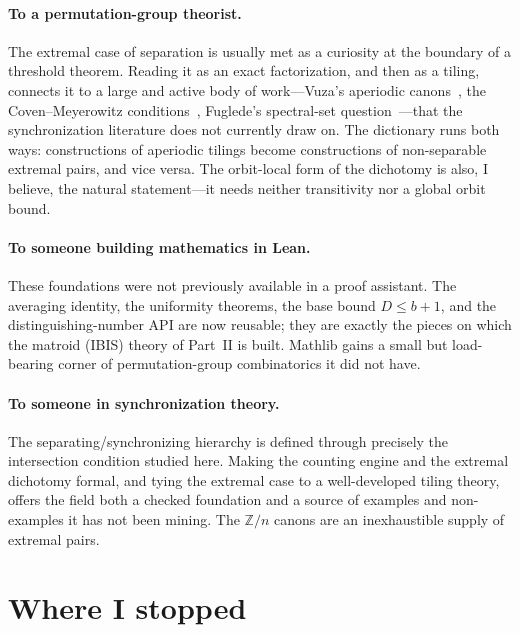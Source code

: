 \documentclass[11pt]{article}
\newcommand{\Z}{\mathbb{Z}}
\begin{document}
\paragraph{To a permutation-group theorist.} The extremal case of separation is
usually met as a curiosity at the boundary of a threshold theorem. Reading it as
an exact factorization, and then as a tiling, connects it to a large and active
body of work---Vuza's aperiodic canons~\cite{Vuza1991}, the Coven--Meyerowitz
conditions~\cite{CovenMeyerowitz1999}, Fuglede's spectral-set
question~\cite{Fuglede1974}---that the synchronization literature does not
currently draw on. The dictionary runs both ways: constructions of aperiodic
tilings become constructions of non-separable extremal pairs, and vice versa. The
orbit-local form of the dichotomy is also, I believe, the natural statement---it
needs neither transitivity nor a global orbit bound.

\paragraph{To someone building mathematics in Lean.} These foundations were not
previously available in a proof assistant. The averaging identity, the uniformity
theorems, the base bound $D\le b+1$, and the distinguishing-number API are now
reusable; they are exactly the pieces on which the matroid (IBIS) theory of
Part~II is built. Mathlib gains a small but load-bearing corner
of permutation-group combinatorics it did not have.

\paragraph{To someone in synchronization theory.} The separating/synchronizing
hierarchy is defined through precisely the intersection condition studied here.
Making the counting engine and the extremal dichotomy formal, and tying the
extremal case to a well-developed tiling theory, offers the field both a checked
foundation and a source of examples and non-examples it has not been mining. The
$\Z/n$ canons are an inexhaustible supply of extremal pairs.

\section{Where I stopped}
\label{sec:future}
\end{document}
